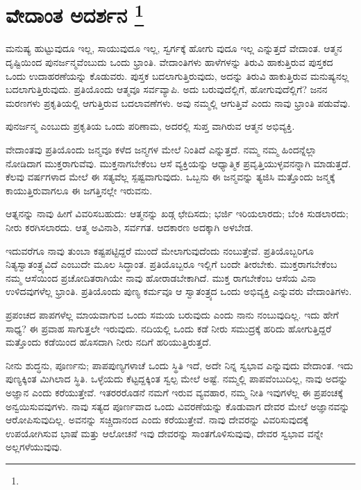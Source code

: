 
\chapter[ವೇದಾಂತ ಅದರ್ಶನ ]{ವೇದಾಂತ ಅದರ್ಶನ \protect\footnote{}}

ಮನುಷ್ಯ ಹುಟ್ಟುವುದೂ ಇಲ್ಲ, ಸಾಯುವುದೂ ಇಲ್ಲ, ಸ್ವರ್ಗಕ್ಕೆ ಹೋಗು ವುದೂ ಇಲ್ಲ ಎನ್ನುತ್ತದೆ ವೇದಾಂತ. ಆತ್ಮನ ದೃಷ್ಟಿಯಿಂದ ಪುನರ್ಜನ್ಮವೆಂಬುದು ಒಂದು ಭ್ರಾಂತಿ. ವೇದಾಂತಿಗಳು ಹಾಳೆಗಳನ್ನು ತಿರುವಿ ಹಾಕುತ್ತಿರುವ ಪುಸ್ತಕದ ಒಂದು ಉದಾಹರಣೆಯನ್ನು ಕೊಡುವರು. ಪುಸ್ತಕ ಬದಲಾಗುತ್ತಿರುವುದು, ಅದನ್ನು ತಿರುವಿ ಹಾಕುತ್ತಿರುವ ಮನುಷ್ಯನಲ್ಲ ಬದಲಾಗುತ್ತಿರುವುದು. ಪ್ರತಿಯೊಂದು ಆತ್ಮವೂ ಸರ್ವವ್ಯಾಪಿ. ಅದು ಬರುವುದೆಲ್ಲಿಗೆ, ಹೋಗುವುದೆಲ್ಲಿಗೆ? ಜನನ ಮರಣಗಳು ಪ್ರಕೃತಿಯಲ್ಲಿ ಆಗುತ್ತಿರುವ ಬದಲಾವಣೆಗಳು. ಅವು ನಮ್ಮಲ್ಲಿ ಆಗುತ್ತಿವೆ ಎಂದು ನಾವು ಭ್ರಾಂತಿ ಪಡುವೆವು.

ಪುನರ್ಜನ್ಮ ಎಂಬುದು ಪ್ರಕೃತಿಯ ಒಂದು ಪರಿಣಾಮ, ಅದರಲ್ಲಿ ಸುಪ್ತ ವಾಗಿರುವ ಆತ್ಮನ ಅಭಿವ್ಯಕ್ತಿ.

ವೇದಾಂತವು ಪ್ರತಿಯೊಂದು ಜನ್ಮವೂ ಕಳೆದ ಜನ್ಮಗಳ ಮೇಲೆ ನಿಂತಿದೆ ಎನ್ನುತ್ತದೆ. ನಮ್ಮ ನಮ್ಮ ಹಿಂದನ್ನೆಲ್ಲಾ ನೋಡಿದಾಗ ಮುಕ್ತರಾಗುವೆವು. ಮುಕ್ತನಾಗಬೇಕೆಂಬ ಆಸೆ ವ್ಯಕ್ತಿಯನ್ನು ಆಧ್ಯಾತ್ಮಿಕ ಪ್ರವೃತ್ತಿಯುಳ್ಳವನನ್ನಾಗಿ ಮಾಡುತ್ತದೆ. ಕೆಲವು ವರ್ಷಗಳಾದ ಮೇಲೆ ಈ ಸತ್ಯವೆಲ್ಲ ಸ್ಪಷ್ಟವಾಗುವುದು. ಒಬ್ಬನು ಈ ಜನ್ಮವನ್ನು ತ್ಯಜಿಸಿ ಮತ್ತೊಂದು ಜನ್ಮಕ್ಕೆ ಕಾಯುತ್ತಿರುವಾಗಲೂ ಈ ಜಗತ್ತಿನಲ್ಲೇ ಇರುವನು.

ಆತ್ನನನ್ನು ನಾವು ಹೀಗೆ ವಿವರಿಸಬಹುದು: ಆತ್ಮನನ್ನು ಖಡ್ಗ ಛೇದಿಸದು; ಭರ್ಜಿ ಇರಿಯಲಾರದು; ಬೆಂಕಿ ಸುಡಲಾರದು; ನೀರು ಕರಗಿಸಲಾರದು. ಆತ್ಮ ಅವಿನಾಶಿ, ಸರ್ವಗತ. ಆದಕಾರಣ ಅದಕ್ಕಾಗಿ ಅಳಬೇಡ.

ಇದುವರೆಗೂ ನಾವು ತುಂಬಾ ಕಷ್ಟಪಟ್ಟಿದ್ದರೆ ಮುಂದೆ ಮೇಲಾಗುವುದೆಂದು ನಂಬುತ್ತೇವೆ. ಪ್ರತಿಯೊಬ್ಬರಿಗೂ ನಿತ್ಯಸ್ವಾತಂತ್ರ್ಯವಿದೆ ಎಂಬುದೇ ಮೂಲ ಸಿದ್ಧಾಂತ. ಪ್ರತಿಯೊಬ್ಬರೂ ಇಲ್ಲಿಗೆ ಬಂದೇ ತೀರಬೇಕು. ಮುಕ್ತರಾಗಬೇಕೆಂಬ ನಮ್ಮ ಆಸೆಯಿಂದ ಪ್ರಚೋದಿತರಾಗಿಯೇ ನಾವು ಹೋರಾಡಬೇಕಾಗಿದೆ. ಮುಕ್ತ ರಾಗಬೇಕೆಂಬ ಆಸೆಯ ವಿನಾ ಉಳಿದವುಗಳೆಲ್ಲ ಭ್ರಾಂತಿ. ಪ್ರತಿಯೊಂದು ಪುಣ್ಯ ಕರ್ಮವೂ ಆ ಸ್ವಾತಂತ್ರ್ಯದ ಒಂದು ಅಭಿವ್ಯಕ್ತಿ ಎನ್ನುವರು ವೇದಾಂತಿಗಳು.

ಪ್ರಪಂಚದ ಪಾಪಗಳೆಲ್ಲ ಮಾಯವಾಗುವ ಒಂದು ಸಮಯ ಬರುವುದು ಎಂದು ನಾನು ನಂಬುವುದಿಲ್ಲ. ಇದು ಹೇಗೆ ಸಾಧ್ಯ? ಈ ಪ್ರವಾಹ ಸಾಗುತ್ತಲೇ ಇರುವುದು. ನದಿಯಲ್ಲಿ ಒಂದು ಕಡೆ ನೀರು ಸಮುದ್ರಕ್ಕೆ ಹರಿದು ಹೋಗುತ್ತಿದ್ದರೆ ಮತ್ತೊಂದು ಕಡೆಯಿಂದ ಹೊಸದಾಗಿ ನೀರು ನದಿಗೆ ಹರಿಯುತ್ತಿರುತ್ತದೆ.

ನೀನು ಶುದ್ಧನು, ಪೂರ್ಣನು; ಪಾಪಪುಣ್ಯಗಳಾಚೆ ಒಂದು ಸ್ಥಿತಿ ಇದೆ, ಅದೇ ನಿನ್ನ ಸ್ವಭಾವ ಎನ್ನುವುದು ವೇದಾಂತ. ಇದು ಪುಣ್ಯಕ್ಕಿಂತ ಮಿಗಿಲಾದ ಸ್ಥಿತಿ. ಒಳ್ಳೆಯದು ಕೆಟ್ಟದ್ದಕ್ಕಿಂತ ಸ್ವಲ್ಪ ಮೇಲೆ ಅಷ್ಟೆ. ನಮ್ಮಲ್ಲಿ ಪಾಪವೆಂಬುದಿಲ್ಲ, ನಾವು ಅದನ್ನು ಅಜ್ಞಾನ ಎಂದು ಕರೆಯುತ್ತೇವೆ. ಇತರರರೊಡನೆ ನಮಗೆ ಇರುವ ವ್ಯವಹಾರ, ನಮ್ಮ ನೀತಿ ಇವುಗಳೆಲ್ಲ ಈ ಪ್ರಪಂಚಕ್ಕೆ ಅನ್ವಯಿಸುವವುಗಳು. ನಾವು ಸತ್ಯದ ಪೂರ್ಣವಾದ ಒಂದು ವಿವರಣೆಯನ್ನು ಕೊಡುವಾಗ ದೇವರ ಮೇಲೆ ಅಜ್ಞಾನವನ್ನು ಆರೋಪಿಸುವುದಿಲ್ಲ. ಅವನನ್ನು ಸಚ್ಚಿದಾನಂದ ಎಂದು ಕರೆಯುತ್ತೇವೆ. ನಾವು ದೇವರನ್ನು ವಿವರಿಸುವುದಕ್ಕೆ ಉಪಯೋಗಿಸುವ ಭಾಷೆ ಮತ್ತು ಆಲೋಚನೆ ಇವು ದೇವರನ್ನು ಸಾಂತಗೊಳಿಸುವುವು, ದೇವರ ಸ್ವಭಾವ ವನ್ನೇ ಅಲ್ಲಗಳೆಯುವುವು.

